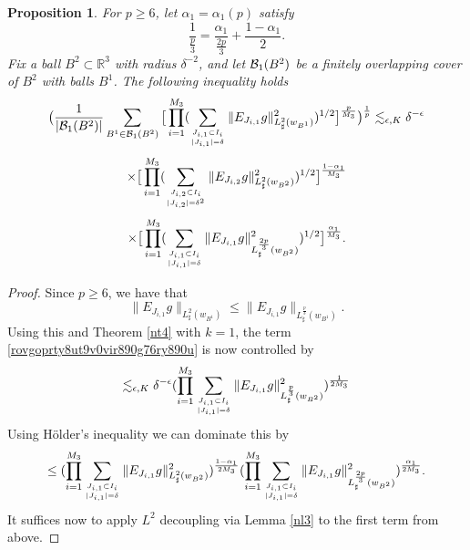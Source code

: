 \documentclass[amssymb,amsfonts,12pt]{amsart}
\newtheorem{proposition}[theorem]{Proposition}
\def\R{{\mathbb R}}
\begin{document}
\begin{proposition}
\label{np4}
For $p\ge 6$, let $\alpha_1=\alpha_1(p)$ satisfy
$$\frac1{\frac{p}{3}}=\frac{\alpha_1}{\frac{2p}{3}}+\frac{1-\alpha_1}{2}.$$
Fix a  ball $B^2\subset \R^3$ with radius $\delta^{-2}$, and let ${\mathcal B}_1(B^2)$ be a finitely overlapping cover of $B^2$ with balls $B^1$. The following inequality holds
\begin{equation}
\label{rovgoprty8ut9v0vir890g76ry890u}
\big(\frac1{|{\mathcal B}_1(B^2)|}\sum_{B^1\in{\mathcal B}_1(B^2)}\big[\prod_{i=1}^{M_3}(\sum_{J_{i,1}\subset I_i\atop{|J_{i,1}|=\delta}}\|E_{J_{i,1}}g\|_{L^{2}_{\sharp}(w_{B^1})}^2)^{1/2}\big]^{\frac{p}{M_3}
}\big)^{\frac1p}
\lesssim_{\epsilon,K} \delta^{-\epsilon}
\end{equation}
$$\times \big[\prod_{i=1}^{M_3}(\sum_{J_{i,2}\subset I_i\atop{|J_{i,2}|=\delta^2}}\|E_{J_{i,2}}g\|_{L^{2}_{\sharp}(w_{B^2})}^2)^{1/2}\big]^{\frac{1-\alpha_1}{M_3}
}$$
$$\times \big[\prod_{i=1}^{M_3}(\sum_{J_{i,1}\subset I_i\atop{|J_{i,1}|=\delta}}\|E_{J_{i,1}}g\|_{L^{\frac{2p}3}_{\sharp}(w_{B^2})}^2)^{1/2}\big]^{\frac{\alpha_1}{M_3}
}.$$
\end{proposition}
\begin{proof}
Since $p\ge 6$, we have that $$\|E_{J_{i,1}}g\|_{L^{2}_{\sharp}(w_{B^1})}\le \|E_{J_{i,1}}g\|_{L^{\frac{p}{3}}_{\sharp}(w_{B^1})}.$$
Using this and  Theorem \ref{nt4} with $k=1$,  the term \eqref{rovgoprty8ut9v0vir890g76ry890u} is now controlled by
$$
\lesssim_{\epsilon,K}\delta^{-\epsilon} (\prod_{i=1}^{M_3}\sum_{J_{i,1}\subset I_i\atop{|J_{i,1}|=\delta}}\|E_{J_{i,1}}g\|_{L_{\sharp}^{\frac{p}3}(w_{B^2})}^2)^{\frac1{2M_3}}$$
Using  H\"older's inequality we can dominate this by
$$\le (\prod_{i=1}^{M_3}\sum_{J_{i,1}\subset I_i\atop{|J_{i,1}|=\delta}}\|E_{J_{i,1}}g\|_{L_{\sharp}^{2}(w_{B^2})}^2)^{\frac{1-\alpha_1}{2M_3}}(\prod_{i=1}^{M_3}\sum_{J_{i,1}\subset I_i\atop{|J_{i,1}|=\delta}}\|E_{J_{i,1}}g\|_{L_{\sharp}^{\frac{2p}3}(w_{B^2})}^2)^{\frac{\alpha_1}{2M_3}}.$$
It suffices now to apply $L^2$ decoupling via Lemma \ref{nl3} to the first term from above.

\end{proof}
\medskip
\end{document}
